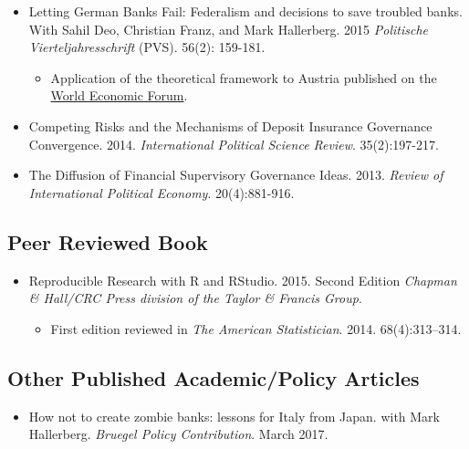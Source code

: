\documentclass[a4paper]{article}
\begin{document}
{\begin{itemize}
    \item Letting German Banks Fail: Federalism and decisions to save troubled banks. With Sahil Deo, Christian Franz, and Mark Hallerberg. 2015 \emph{Politische Vierteljahresschrift} (PVS). 56(2): 159-181.

        \begin{itemize}
            \item Application of the theoretical framework to Austria published on the \href{https://www.weforum.org/agenda/2015/03/a-bank-bailout-lesson-from-austria/}{World Economic Forum}.
        \end{itemize}

    \item Competing Risks and the Mechanisms of Deposit Insurance Governance Convergence. 2014. {\emph{International Political Science Review}}. 35(2):197-217.

    \item The Diffusion of Financial Supervisory Governance Ideas. 2013. {\emph{Review of International Political Economy}}. 20(4):881-916.

\end{itemize}

\subsection*{Peer Reviewed Book}

\begin{itemize}
    \item Reproducible Research with R and RStudio. 2015. Second Edition {\emph{Chapman \& Hall/CRC Press division of the Taylor \& Francis Group}}.

        \begin{itemize}
            \item First edition reviewed in \emph{The American Statistician}. 2014. 68(4):313--314.
        \end{itemize}

\end{itemize}

\subsection*{Other Published Academic/Policy Articles}

\begin{itemize}

    \item How not to create zombie banks: lessons for Italy from Japan. with Mark Hallerberg. \emph{Bruegel Policy Contribution}. March 2017.


\end{itemize}}
\end{document}
